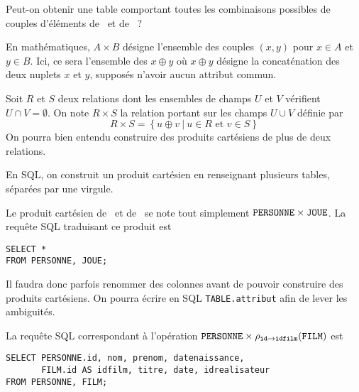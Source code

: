 Peut-on obtenir une table comportant toutes les combinaisons possibles de couples d'éléments de \PERSONNE\ et de \JOUE\ ?

\begin{rem} 
  En mathématiques, $A\times B$ désigne l'ensemble des couples $(x,y)$
pour $x\in A$ et $y\in B$. Ici, ce sera l'ensemble des $x\oplus y$ où
$x\oplus y$ désigne la concaténation des deux nuplets $x$ et $y$,
supposés n'avoir aucun attribut commun.
\end{rem}


\begin{defi}
  Soit $R$ et $S$ deux relations dont les ensembles de champs $U$ et $V$ vérifient
  $U\cap V =\emptyset$. On note $R\times S$ la relation portant sur les champs $U\cup
  V$ définie par
  \begin{equation*}
    R\times S  = \left\{u\oplus v ~|~ u\in R \text{ et } v\in S\right\} 
  \end{equation*}
  On pourra bien entendu construire des produits cartésiens de plus de deux relations. 
\end{defi}

En SQL, on construit un produit cartésien en renseignant plusieurs tables, séparées par une virgule. 
\begin{exemple}
  Le produit cartésien de \PERSONNE\ et de \JOUE\ se note tout simplement $\mathtt{PERSONNE} \times \mathtt{JOUE}$. 
  La requête SQL traduisant ce produit est 
\begin{verbatim}
SELECT * 
FROM PERSONNE, JOUE;
\end{verbatim}
\end{exemple}


\begin{rem}
  Il faudra donc parfois renommer des colonnes avant de pouvoir construire des produits cartésiens. 
  On pourra écrire en SQL \texttt{TABLE.attribut} afin de lever les ambiguités. 
\end{rem}

\begin{exemple}
  La requête SQL correspondant à l'opération $\mathtt{PERSONNE} \times \rho_{\mathtt{id} \rightarrow \mathtt{idfilm}}(\mathtt{FILM})$ est
\begin{verbatim}
SELECT PERSONNE.id, nom, prenom, datenaissance, 
       FILM.id AS idfilm, titre, date, idrealisateur
FROM PERSONNE, FILM;
\end{verbatim}

\end{exemple}


